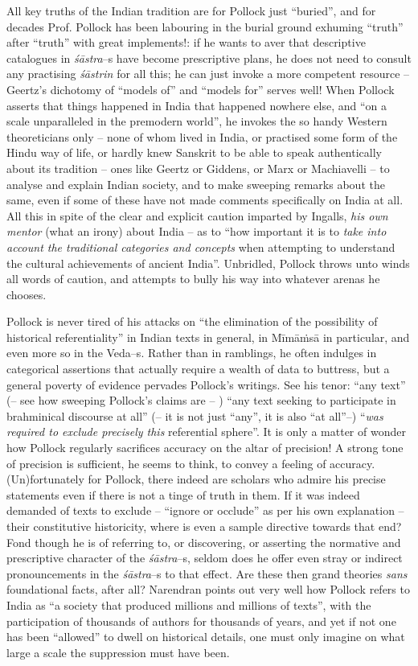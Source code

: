 All key truths of the Indian tradition are for Pollock just “buried”, and for decades Prof. Pollock has been labouring in the burial ground exhuming “truth” after “truth” with great implements!: if he wants to aver that descriptive catalogues in \textit{śāstra}–s have become prescriptive plans, he does not need to consult any practising \textit{śāstrin} for all this; he can just invoke a more competent resource – Geertz’s dichotomy of “models of” and “models for” serves well! When Pollock asserts that things happened in India that happened nowhere else, and “on a scale unparalleled in the premodern world”, he invokes the so handy Western theoreticians only – none of whom lived in India, or practised some form of the Hindu way of life, or hardly knew Sanskrit to be able to speak authentically about its tradition – ones like Geertz or Giddens, or Marx or Machiavelli – to analyse and explain Indian society, and to make sweeping remarks about the same, even if some of these have not made comments specifically on India at all. All this in spite of the clear and explicit caution imparted by Ingalls, \textit{his own mentor} (what an irony) about India – as to “how important it is to \textit{take into account the traditional categories and concepts} when attempting to understand the cultural achievements of ancient India”. Unbridled, Pollock throws unto winds all words of caution, and attempts to bully his way into whatever arenas he chooses.

Pollock is never tired of his attacks on “the elimination of the possibility of historical referentiality” in Indian texts in general, in Mīmāṁsā in particular, and even more so in the Veda–s. Rather than in ramblings, he often indulges in categorical assertions that actually require a wealth of data to buttress, but a general poverty of evidence pervades Pollock’s writings. See his tenor: “any text” (– see how sweeping Pollock’s claims are – ) “any text seeking to participate in brahminical discourse at all” (– it is not just “any”, it is also “at all”–) “\textit{was required to exclude precisely this} referential sphere”. It is only a matter of wonder how Pollock regularly sacrifices accuracy on the altar of precision! A strong tone of precision is sufficient, he seems to think, to convey a feeling of accuracy. (Un)fortunately for Pollock, there indeed are scholars who admire his precise statements even if there is not a tinge of truth in them. If it was indeed demanded of texts to exclude – “ignore or occlude” as per his own explanation – their constitutive historicity, where is even a sample directive towards that end? Fond though he is of referring to, or discovering, or asserting the normative and prescriptive character of the \textit{śāstra}–s, seldom does he offer even stray or indirect pronouncements in the \textit{śāstra}–s to that effect. Are these then grand theories \textit{sans} foundational facts, after all? Narendran points out very well how Pollock refers to India as “a society that produced millions and millions of texts”, with the participation of thousands of authors for thousands of years, and yet if not one has been “allowed” to dwell on historical details, one must only imagine on what large a scale the suppression must have been.

